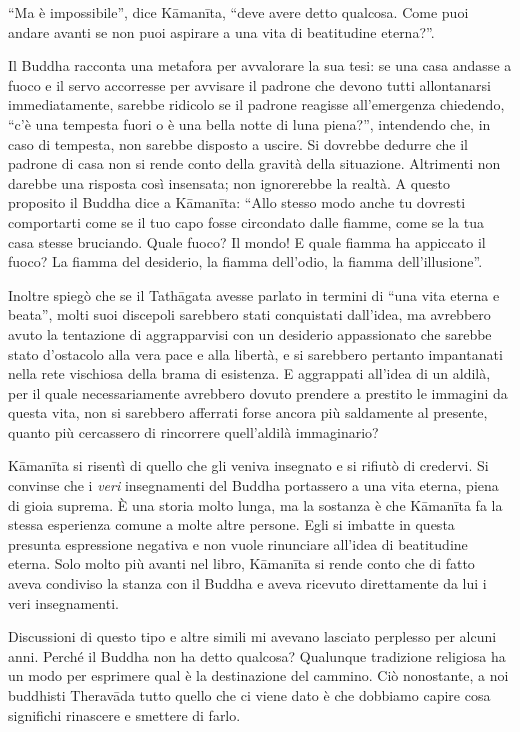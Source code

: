 ``Ma è impossibile'', dice Kāmanīta, ``deve avere detto qualcosa. Come puoi andare avanti se non puoi aspirare a una vita di beatitudine eterna?''.

Il Buddha racconta una metafora per avvalorare la sua tesi: se una casa andasse a fuoco e il servo accorresse per avvisare il padrone che devono tutti allontanarsi immediatamente, sarebbe ridicolo se il padrone reagisse all'emergenza chiedendo, ``c'è una tempesta fuori o è una bella notte di luna piena?'', intendendo che, in caso di tempesta, non sarebbe disposto a uscire. Si dovrebbe dedurre che il padrone di casa non si rende conto della gravità della situazione. Altrimenti non darebbe una risposta così insensata; non ignorerebbe la realtà. A questo proposito il Buddha dice a Kāmanīta: ``Allo stesso modo anche tu dovresti comportarti come se il tuo capo fosse circondato dalle fiamme, come se la tua casa stesse bruciando. Quale fuoco? Il mondo! E quale fiamma ha appiccato il fuoco? La fiamma del desiderio, la fiamma dell'odio, la fiamma dell'illusione''. 

Inoltre spiegò che se il Tathāgata avesse parlato in termini di ``una vita eterna e beata'', molti suoi discepoli sarebbero stati conquistati dall'idea, ma avrebbero avuto la tentazione di aggrapparvisi con un desiderio appassionato che sarebbe stato d'ostacolo alla vera pace e alla libertà, e si sarebbero pertanto impantanati nella rete vischiosa della brama di esistenza. E aggrappati all'idea di un aldilà, per il quale necessariamente avrebbero dovuto prendere a prestito le immagini da questa vita, non si sarebbero afferrati forse ancora più saldamente al presente, quanto più cercassero di rincorrere quell'aldilà immaginario?

Kāmanīta si risentì di quello che gli veniva insegnato e si rifiutò di credervi. Si convinse che i \textit{veri} insegnamenti del Buddha portassero a una vita eterna, piena di gioia suprema. È una storia molto lunga, ma la sostanza è che Kāmanīta fa la stessa esperienza comune a molte altre persone. Egli si imbatte in questa presunta espressione negativa e non vuole rinunciare all'idea di beatitudine eterna. Solo molto più avanti nel libro, Kāmanīta si rende conto che di fatto aveva condiviso la stanza con il Buddha e aveva ricevuto direttamente da lui i veri insegnamenti.

Discussioni di questo tipo e altre simili mi avevano lasciato perplesso per alcuni anni. Perché il Buddha non ha detto qualcosa? Qualunque tradizione religiosa ha un modo per esprimere qual è la destinazione del cammino. Ciò nonostante, a noi buddhisti Theravāda tutto quello che ci viene dato è che dobbiamo capire cosa significhi rinascere e smettere di farlo.

